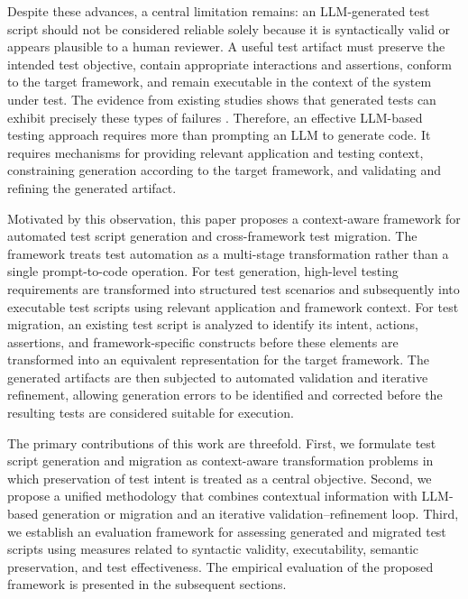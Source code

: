 \documentclass[pdflatex,sn-mathphys-num]{sn-jnl}
\begin{document}
Despite these advances, a central limitation remains: an LLM-generated test
script should not be considered reliable solely because it is syntactically
valid or appears plausible to a human reviewer. A useful test artifact must
preserve the intended test objective, contain appropriate interactions and
assertions, conform to the target framework, and remain executable in the
context of the system under test. The evidence from existing studies shows
that generated tests can exhibit precisely these types of failures
\cite{yuan2024chatgpt,ferreira2025acceptance}. Therefore, an effective
LLM-based testing approach requires more than prompting an LLM to generate
code. It requires mechanisms for providing relevant application and testing
context, constraining generation according to the target framework, and
validating and refining the generated artifact.

Motivated by this observation, this paper proposes a context-aware framework
for automated test script generation and cross-framework test migration. The
framework treats test automation as a multi-stage transformation rather than
a single prompt-to-code operation. For test generation, high-level testing
requirements are transformed into structured test scenarios and subsequently
into executable test scripts using relevant application and framework
context. For test migration, an existing test script is analyzed to identify
its intent, actions, assertions, and framework-specific constructs before
these elements are transformed into an equivalent representation for the
target framework. The generated artifacts are then subjected to automated
validation and iterative refinement, allowing generation errors to be
identified and corrected before the resulting tests are considered suitable
for execution.

The primary contributions of this work are threefold. First, we formulate
test script generation and migration as context-aware transformation problems
in which preservation of test intent is treated as a central objective.
Second, we propose a unified methodology that combines contextual information
with LLM-based generation or migration and an iterative validation--refinement
loop. Third, we establish an evaluation framework for assessing generated and
migrated test scripts using measures related to syntactic validity,
executability, semantic preservation, and test effectiveness. The empirical
evaluation of the proposed framework is presented in the subsequent sections.
\end{document}

